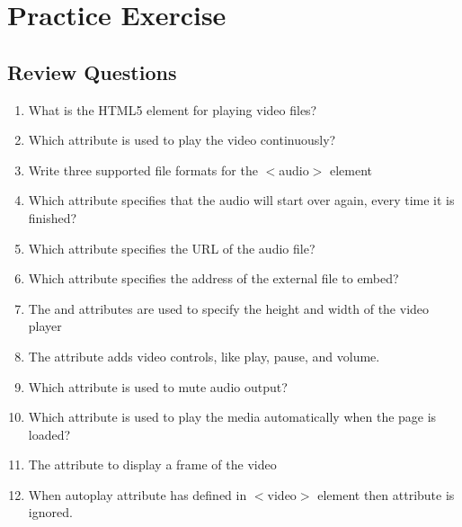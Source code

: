 \documentclass[11pt,a4paper]{article}
\begin{document}
\section*{Practice Exercise}
\subsection*{Review Questions}
\begin{enumerate}\itemsep10pt
\item What is the HTML5 element for playing video files? \underline{\hspace{2cm}}
\item Which attribute is used to play the video continuously? \underline{\hspace{2cm}}
\item Write three supported file formats for the $<$audio$>$ element \underline{\hspace{3cm}}
\item Which attribute specifies that the audio will start over again, every time it is finished? \underline{\hspace{2cm}}
\item Which attribute specifies the URL of the audio file? \underline{\hspace{2cm}}
\item Which attribute specifies the address of the external file to embed? \underline{\hspace{2cm}}
\item The \underline{\hspace{2cm}} and  \underline{\hspace{2cm}} attributes are used to specify the height and width of the video player
\item The \underline{\hspace{2cm}} attribute adds video controls, like play, pause, and volume.
\item Which attribute is used to mute audio output? \underline{\hspace{2cm}}
\item Which attribute is used to play the media automatically when the page is loaded? \underline{\hspace{2cm}}
\item The \underline{\hspace{2cm}} attribute to display a frame of the video
\item When autoplay attribute has defined in $<$video$>$ element then \underline{\hspace{2cm}} attribute is ignored.
\end{enumerate}
\end{document}
